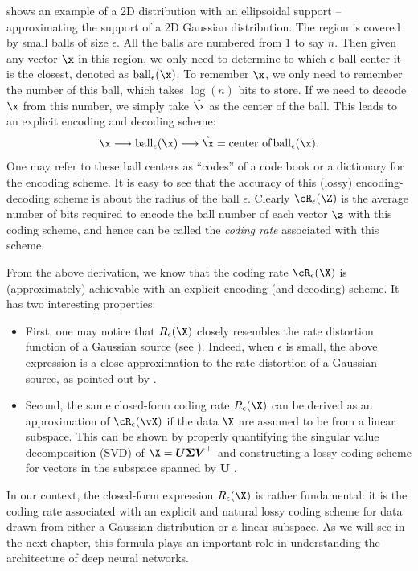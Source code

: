 \documentclass[../../book-main.tex]{subfiles}
\begin{document}
\begin{example}
	 shows an example of a 2D distribution with an ellipsoidal support -- approximating the support of a 2D Gaussian distribution. The region is covered by small balls of size $\epsilon$. All the balls are numbered from $1$ to say $n$. Then given any vector $\x$ in this region, we
	only need to determine to which $\epsilon$-ball center it is the closest, denoted as $\operatorname{ball}_{\epsilon}(\x)$. To remember $\x$, we only need to remember the number of this ball, which takes $\log(n)$ bits to store. If we need to decode $\x$ from this number, we simply take $\hat \x$ as the center of the ball. This leads to an explicit encoding and decoding scheme:
	\begin{equation}
		\x \longrightarrow \operatorname{ball}_{\epsilon}(\x) \longrightarrow \hat \x = \mbox{center of} \operatorname{ball}_{\epsilon}(\x).
	\end{equation}
	One may refer to these ball centers as  ``codes'' of a code book or a dictionary for the encoding scheme. It is easy to see that the accuracy of this (lossy) encoding-decoding scheme is about the radius of the ball $\epsilon$. 
	Clearly $\cR_{\epsilon}(\Z)$ is the average
	number of bits required to encode the ball number of each vector $\z$ with
	this coding scheme, and hence can be called the {\em coding rate} associated with this scheme.
\end{example}


From the above derivation, we know that the coding rate $\cR_{\epsilon}(\X)$ is (approximately) achievable with an explicit encoding (and decoding) scheme. It has two interesting  properties:
\begin{itemize}
	\item First, one may notice that $R_{\epsilon}(\X)$ closely resembles the rate distortion function of a Gaussian source \cite{Cover-Thomas} (see ). Indeed, when $\epsilon$ is small, the above expression is a close approximation to the rate distortion of a Gaussian source, as pointed out by   \cite{MaY2007-PAMI}.
	\item Second, the same closed-form coding rate $R_{\epsilon}(\X)$ can be derived as an approximation of \(\cR_{\epsilon}(\vX)\) if the data $\X$ are assumed to be from a linear subspace. This can be shown by properly quantifying the singular value decomposition (SVD) of $\X = \boldsymbol{U} \boldsymbol{\Sigma}\boldsymbol{V}^\top$ and constructing a lossy coding scheme for vectors in the subspace spanned by $\boldsymbol{U}$ \cite{MaY2007-PAMI}.
\end{itemize}
In our context, the closed-form expression $R_{\epsilon}(\X)$ is rather fundamental: it is the coding rate associated with an explicit and natural lossy coding scheme for data drawn from either a Gaussian distribution or a linear subspace. As we will see in the next chapter, this formula plays an important role in understanding the architecture of deep neural networks.
\end{document}
